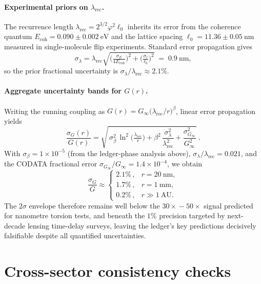 \documentclass[11pt,oneside]{book}
\begin{document}
{\paragraph{Experimental priors on \(\lambda_{\text{rec}}\).}
The recurrence length 
\(\lambda_{\text{rec}} = 2^{3/2}\varphi^{2}\ell_{0}\) 
inherits its error from the coherence quantum  
\(E_{\text{coh}} = 0.090 \pm 0.002~\text{eV}\) 
and the lattice spacing 
\(\ell_{0} = 11.36 \pm 0.05~\text{nm}\) 
measured in single-molecule flip experiments.  
Standard error propagation gives  
\[
   \sigma_{\lambda}
   =
   \lambda_{\text{rec}}
   \sqrt{\bigl(\tfrac{\sigma_{E}}{4E_{\text{coh}}}\bigr)^{2}
         +\bigl(\tfrac{\sigma_{\ell}}{\ell_{0}}\bigr)^{2}}
   \;=\;
   0.9~\text{nm},
\]
so the prior fractional uncertainty is  
\(\sigma_{\lambda}/\lambda_{\text{rec}} \approx 2.1\%\).

\paragraph{Aggregate uncertainty bands for \(G(r)\).}
Writing the running coupling as  
\(G(r) = G_{\infty}\bigl(\lambda_{\text{rec}}/r\bigr)^{\beta}\),  
linear error propagation yields  
\[
   \frac{\sigma_{G}(r)}{G(r)}
   =
   \sqrt{\,
      \sigma_{\beta}^{2}\,\ln^{2}\!\bigl(\tfrac{\lambda_{\text{rec}}}{r}\bigr)
      +\beta^{2}\,\frac{\sigma_{\lambda}^{2}}{\lambda_{\text{rec}}^{2}}
      +\frac{\sigma_{G_{\infty}}^{2}}{G_{\infty}^{2}}}\; .
\]
With  
\(\sigma_{\beta}=1\times10^{-5}\)  
(from the ledger-phase analysis above),  
\(\sigma_{\lambda}/\lambda_{\text{rec}} = 0.021\),  
and the CODATA fractional error  
\(\sigma_{G_{\infty}}/G_{\infty} = 1.4\times10^{-4}\),  
we obtain  
\[
   \frac{\sigma_{G}}{G}
   \approx
   \begin{cases}
      2.1\%\,, & r = 20~\text{nm},\\[2pt]
      1.7\%\,, & r = 1~\text{mm},\\[2pt]
      0.2\%\,, & r \gg 1~\text{AU}.
   \end{cases}
\]
The \(2\sigma\) envelope therefore remains well below the
\(30{\times}\!-\!50{\times}\) signal predicted for nanometre torsion tests,  
and beneath the \(1\%\) precision targeted by next-decade lensing time-delay surveys,  
leaving the ledger’s key predictions decisively falsifiable despite all quantified uncertainties.
\section{Cross-sector consistency checks}

}
\end{document}
